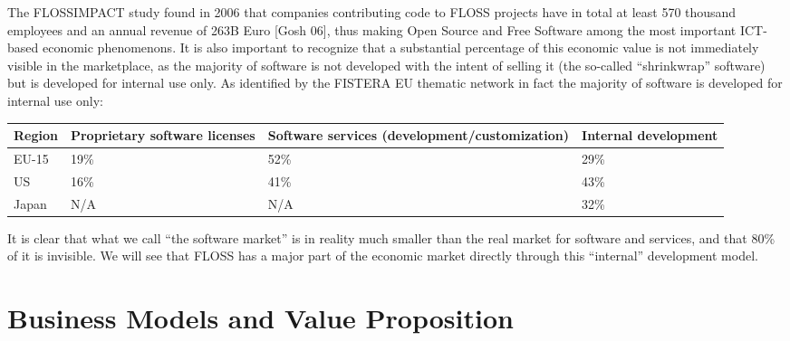 The FLOSSIMPACT study found in 2006 that companies contributing
code to FLOSS projects have in total at least 570 thousand employees and an annual
revenue of 263B Euro [Gosh 06], thus making Open Source and Free Software among the most important ICT-based economic phenomenons. It is also important to recognize that a substantial percentage of this economic value is not immediately visible in the marketplace, as the majority of software is not developed with the intent of selling it (the so-called ``shrinkwrap'' software) but is developed for internal use only. As identified by the FISTERA EU thematic network in fact the majority of software is developed for internal use only:\newline
\begin{tabularx}{\textwidth}{|X|X|X|X|}
\hline
Region & Proprietary software licenses & Software services
(de\-vel\-op\-ment/\-cus\-tom\-i\-za\-ti\-on) & Internal development\\
\hline
EU-15 & 19\% & 52\% & 29\% \\
\hline
US & 16\% & 41\% & 43\% \\
\hline
Japan & N/A & N/A & 32\% \\
\hline
\end{tabularx}

It is clear that what we call ``the software market'' is in reality much smaller
than the real market for software and services, and that 80\% of it is
invisible. We will see that FLOSS has a major part of the economic market
directly through this ``internal'' development model.

\section*{Business Models and Value Proposition}

